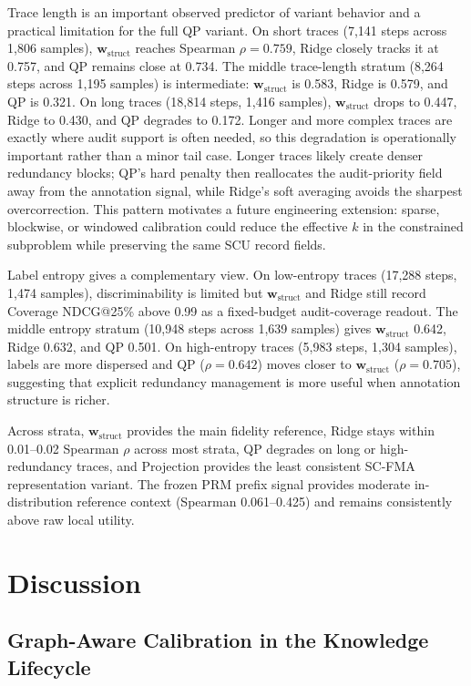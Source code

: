 \documentclass[a4paper,fleqn]{cas-sc}
\newcommand{\wstruct}{\ensuremath{\mathbf{w}_{\mathrm{struct}}}}
\begin{document}
Trace length is an important observed predictor of variant behavior and a practical limitation for the full QP variant. On short traces (7,141 steps across 1,806 samples), \wstruct{} reaches Spearman $\rho = 0.759$, Ridge closely tracks it at 0.757, and QP remains close at 0.734. The middle trace-length stratum (8,264 steps across 1,195 samples) is intermediate: \wstruct{} is 0.583, Ridge is 0.579, and QP is 0.321. On long traces (18,814 steps, 1,416 samples), \wstruct{} drops to 0.447, Ridge to 0.430, and QP degrades to 0.172. Longer and more complex traces are exactly where audit support is often needed, so this degradation is operationally important rather than a minor tail case. Longer traces likely create denser redundancy blocks; QP's hard penalty then reallocates the audit-priority field away from the annotation signal, while Ridge's soft averaging avoids the sharpest overcorrection. This pattern motivates a future engineering extension: sparse, blockwise, or windowed calibration could reduce the effective $k$ in the constrained subproblem while preserving the same SCU record fields.

Label entropy gives a complementary view. On low-entropy traces (17,288 steps, 1,474 samples), discriminability is limited but \wstruct{} and Ridge still record Coverage NDCG@25\% above 0.99 as a fixed-budget audit-coverage readout. The middle entropy stratum (10,948 steps across 1,639 samples) gives \wstruct{} 0.642, Ridge 0.632, and QP 0.501. On high-entropy traces (5,983 steps, 1,304 samples), labels are more dispersed and QP ($\rho = 0.642$) moves closer to \wstruct{} ($\rho = 0.705$), suggesting that explicit redundancy management is more useful when annotation structure is richer.

Across strata, \wstruct{} provides the main fidelity reference, Ridge stays within 0.01--0.02 Spearman $\rho$ across most strata, QP degrades on long or high-redundancy traces, and Projection provides the least consistent SC-FMA representation variant. The frozen PRM prefix signal provides moderate in-distribution reference context (Spearman 0.061--0.425) and remains consistently above raw local utility.

\section{Discussion}
\label{sec:discussion}

\subsection{Graph-Aware Calibration in the Knowledge Lifecycle}
\label{sec:knowledge-lifecycle}
\end{document}
